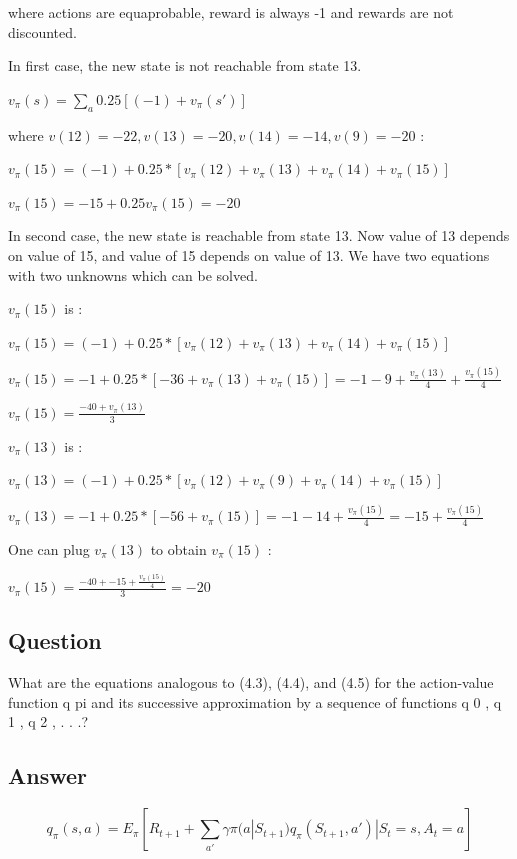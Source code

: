 \documentclass[11pt]{article}
\begin{document}
    where actions are equaprobable, reward is always -1 and rewards are not discounted.

    In first case, the new state is not reachable from state 13.

    $ v_\pi(s) = \sum_{a} 0.25 [(-1) + v_\pi (s')] $

    where $ v(12)=-22, v(13)=-20, v(14)=-14, v(9) = -20 $ :

    $ v_\pi(15) = (-1) + 0.25 * [v_\pi (12) + v_\pi (13) + v_\pi (14) + v_\pi (15) ] $

    $ v_\pi(15) = -15 + 0.25 v_\pi (15) = -20 $

    In second case, the new state is reachable from state 13.
    Now value of 13 depends on value of 15, and value of 15 depends on value of 13.
    We have two equations with two unknowns which can be solved.

    $v_\pi(15)$ is :

    $ v_\pi(15) = (-1) + 0.25 * [v_\pi (12) + v_\pi (13) + v_\pi (14) + v_\pi (15) ] $

    $ v_\pi(15) = -1 + 0.25 * [-36 + v_\pi (13) + v_\pi (15) ] = -1 -9 + \frac{v_\pi (13)}{4}  + \frac{v_\pi (15)}{4}$

    $ v_\pi(15) = \frac{ -40 + v_\pi (13) }{3}$

    $v_\pi(13)$ is :

    $ v_\pi(13) = (-1) + 0.25 * [v_\pi (12) + v_\pi (9) + v_\pi (14) + v_\pi (15) ] $

    $ v_\pi(13) = -1 + 0.25 * [-56 + v_\pi (15) ] = -1 -14 + \frac{v_\pi (15)}{4} =  -15 + \frac{v_\pi (15)}{4} $

    One can plug $ v_\pi(13) $ to obtain $ v_\pi(15) $ :

    $ v_\pi(15) = \frac{ -40 + -15 + \frac{v_\pi (15)}{4} }{3} = -20$

    \subsection{Question}

    What are the equations analogous to (4.3), (4.4), and (4.5) for the action-value function q pi and its successive approximation by a sequence of functions q 0 , q 1 , q 2 , . . .?

    \subsection*{Answer}

    \begin{equation}
        q_{\pi}(s, a) = E_\pi [R_{t+1} + \sum_{a'}  \gamma  \pi(a|S_{t+1}) q_{\pi} (S_{t+1}, a') | S_t = s, A_t = a]
    \end{equation}
\end{document}
